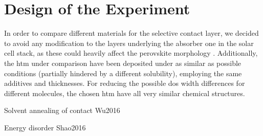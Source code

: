\begin{figure}
\end{figure}

\section{Design of the Experiment}
In order to compare different materials for the selective contact layer, we decided to avoid any modification to the layers underlying the absorber one in the solar cell stack, as these could heavily affect the perovskite morphology \cite{Tao2017}.
Additionally, the \gls{htm} under comparison have been deposited under as similar as possible conditions (partially hindered by a different solubility), employing the same additives and thicknesses.
For reducing the possible \gls{dos} width differences for different molecules, the chosen \gls{htm} have all very similar chemical structures.

%
Solvent annealing of contact Wu2016

Energy disorder Shao2016


